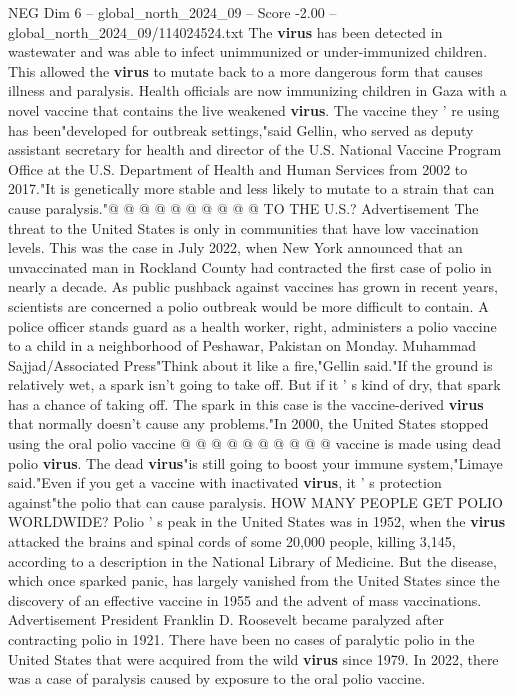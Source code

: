 \begin{textsample}{NEG Dim 6 – global\_north\_2024\_09 – Score -2.00 – global\_north\_2024\_09/114024524.txt}
The \textbf{virus} has been detected in wastewater and was able to infect unimmunized or under-immunized children.
This allowed the \textbf{virus} to mutate back to a more dangerous form that causes illness and paralysis.
Health officials are now immunizing children in Gaza with a novel vaccine that contains the live weakened \textbf{virus}.
The vaccine they ' re using has been"developed for outbreak settings,"said Gellin, who served as deputy assistant secretary for health and director of the U.S.
National Vaccine Program Office at the U.S.
Department of Health and Human Services from 2002 to 2017."It is genetically more stable and less likely to mutate to a strain that can cause paralysis."@ @ @ @ @ @ @ @ @ @ TO THE U.S.?
Advertisement The threat to the United States is only in communities that have low vaccination levels.
This was the case in July 2022, when New York announced that an unvaccinated man in Rockland County had contracted the first case of polio in nearly a decade.
As public pushback against vaccines has grown in recent years, scientists are concerned a polio outbreak would be more difficult to contain.
A police officer stands guard as a health worker, right, administers a polio vaccine to a child in a neighborhood of Peshawar, Pakistan on Monday.
Muhammad Sajjad/Associated Press"Think about it like a fire,"Gellin said."If the ground is relatively wet, a spark isn't going to take off.
But if it ' s kind of dry, that spark has a chance of taking off.
The spark in this case is the vaccine-derived \textbf{virus} that normally doesn't cause any problems."In 2000, the United States stopped using the oral polio vaccine @ @ @ @ @ @ @ @ @ @ vaccine is made using dead polio \textbf{virus}.
The dead \textbf{virus}"is still going to boost your immune system,"Limaye said."Even if you get a vaccine with inactivated \textbf{virus}, it ' s protection against"the polio that can cause paralysis.
HOW MANY PEOPLE GET POLIO WORLDWIDE?
Polio ' s peak in the United States was in 1952, when the \textbf{virus} attacked the brains and spinal cords of some 20,000 people, killing 3,145, according to a description in the National Library of Medicine.
But the disease, which once sparked panic, has largely vanished from the United States since the discovery of an effective vaccine in 1955 and the advent of mass vaccinations.
Advertisement President Franklin D.
Roosevelt became paralyzed after contracting polio in 1921.
There have been no cases of paralytic polio in the United States that were acquired from the wild \textbf{virus} since 1979.
In 2022, there was a case of paralysis caused by exposure to the oral polio vaccine.

\end{textsample}
